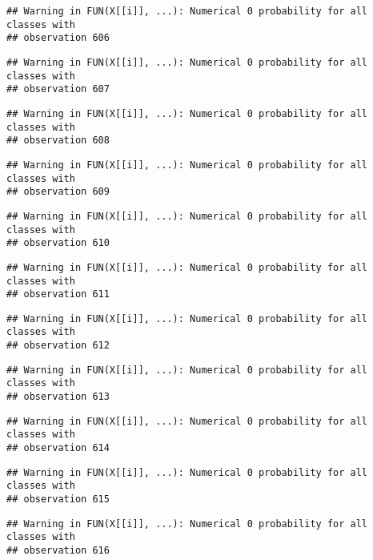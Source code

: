 \documentclass[
]{article}
\begin{document}
\begin{verbatim}
## Warning in FUN(X[[i]], ...): Numerical 0 probability for all classes with
## observation 606
\end{verbatim}

\begin{verbatim}
## Warning in FUN(X[[i]], ...): Numerical 0 probability for all classes with
## observation 607
\end{verbatim}

\begin{verbatim}
## Warning in FUN(X[[i]], ...): Numerical 0 probability for all classes with
## observation 608
\end{verbatim}

\begin{verbatim}
## Warning in FUN(X[[i]], ...): Numerical 0 probability for all classes with
## observation 609
\end{verbatim}

\begin{verbatim}
## Warning in FUN(X[[i]], ...): Numerical 0 probability for all classes with
## observation 610
\end{verbatim}

\begin{verbatim}
## Warning in FUN(X[[i]], ...): Numerical 0 probability for all classes with
## observation 611
\end{verbatim}

\begin{verbatim}
## Warning in FUN(X[[i]], ...): Numerical 0 probability for all classes with
## observation 612
\end{verbatim}

\begin{verbatim}
## Warning in FUN(X[[i]], ...): Numerical 0 probability for all classes with
## observation 613
\end{verbatim}

\begin{verbatim}
## Warning in FUN(X[[i]], ...): Numerical 0 probability for all classes with
## observation 614
\end{verbatim}

\begin{verbatim}
## Warning in FUN(X[[i]], ...): Numerical 0 probability for all classes with
## observation 615
\end{verbatim}

\begin{verbatim}
## Warning in FUN(X[[i]], ...): Numerical 0 probability for all classes with
## observation 616
\end{verbatim}
\end{document}
